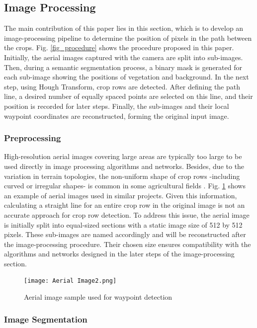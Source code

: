 \documentclass[conference]{IEEEtran}
\begin{document}
	
	\subsection{Image Processing}\label{Image Processing}
	The main contribution of this paper lies in this section, which is to develop an image-processing pipeline to determine the position of pixels in the path between the crops. Fig.
	\ref{fig_procedure}
	shows the procedure proposed in this paper. Initially, the aerial images captured with the camera are split into sub-images. Then, during a semantic segmentation process, a binary mask is generated for each sub-image showing the positions of vegetation and background. In the next step, using Hough Transform, crop rows are detected. After defining the path line, a desired number of equally spaced points are selected on this line, and their position is recorded for later steps. Finally, the sub-images and their local waypoint coordinates are reconstructed, forming the original input image.
	
	\subsubsection{Preprocessing}\label{Preprocessing}\leavevmode
	
	High-resolution aerial images covering large areas are typically too large to be used directly in image processing algorithms and networks.
	Besides, due to the variation in terrain topologies, the non-uniform shape of crop rows -including curved or irregular shapes- is common in some agricultural fields
	\cite{b2, b3, b14}.
	Fig. \ref{fig_Aerial} shows an example of aerial images used in similar projects.
	Given this information, calculating a straight line for an entire crop row in the original image is not an accurate approach for crop row detection.
	To address this issue, the aerial image is initially split into equal-sized sections with a static image size of 512 by 512 pixels. These sub-images are named accordingly and will be reconstructed after the image-processing procedure. Their chosen size ensures compatibility with the algorithms and networks designed in the later steps of the image-processing section.
	
	
	\begin{figure}[t]
		\centering
		\texttt{[image: Aerial Image2.png]}
		\caption{Aerial image sample used for waypoint detection
			\cite{b5}}
		\label{fig_Aerial}
	\end{figure}
	
	\subsubsection{Image Segmentation}\label{Image Segmentation}\leavevmode
	
\end{document}
